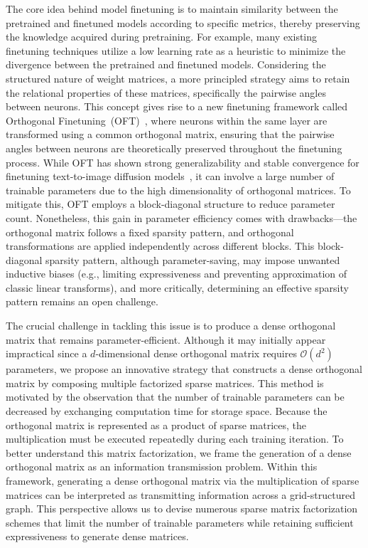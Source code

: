 The core idea behind model finetuning is to maintain similarity between the pretrained and finetuned models according to specific metrics, thereby preserving the knowledge acquired during pretraining. For example, many existing finetuning techniques utilize a low learning rate as a heuristic to minimize the divergence between the pretrained and finetuned models. Considering the structured nature of weight matrices, a more principled strategy aims to retain the relational properties of these matrices, specifically the pairwise angles between neurons. This concept gives rise to a new finetuning framework called Orthogonal Finetuning~(OFT)~\cite{qiu2023controlling}, where neurons within the same layer are transformed using a common orthogonal matrix, ensuring that the pairwise angles between neurons are theoretically preserved throughout the finetuning process. While OFT has shown strong generalizability and stable convergence for finetuning text-to-image diffusion models~\cite{qiu2023controlling}, it can involve a large number of trainable parameters due to the high dimensionality of orthogonal matrices. To mitigate this, OFT employs a block-diagonal structure to reduce parameter count. Nonetheless, this gain in parameter efficiency comes with drawbacks—the orthogonal matrix follows a fixed sparsity pattern, and orthogonal transformations are applied independently across different blocks. This block-diagonal sparsity pattern, although parameter-saving, may impose unwanted inductive biases (e.g., limiting expressiveness and preventing approximation of classic linear transforms), and more critically, determining an effective sparsity pattern remains an open challenge.

The crucial challenge in tackling this issue is to produce a dense orthogonal matrix that remains parameter-efficient. Although it may initially appear impractical since a $d$-dimensional dense orthogonal matrix requires $\mathcal{O}(d^2)$ parameters, we propose an innovative strategy that constructs a dense orthogonal matrix by composing multiple factorized sparse matrices. This method is motivated by the observation that the number of trainable parameters can be decreased by exchanging computation time for storage space. Because the orthogonal matrix is represented as a product of sparse matrices, the multiplication must be executed repeatedly during each training iteration. To better understand this matrix factorization, we frame the generation of a dense orthogonal matrix as an information transmission problem. Within this framework, generating a dense orthogonal matrix via the multiplication of sparse matrices can be interpreted as transmitting information across a grid-structured graph. This perspective allows us to devise numerous sparse matrix factorization schemes that limit the number of trainable parameters while retaining sufficient expressiveness to generate dense matrices.

